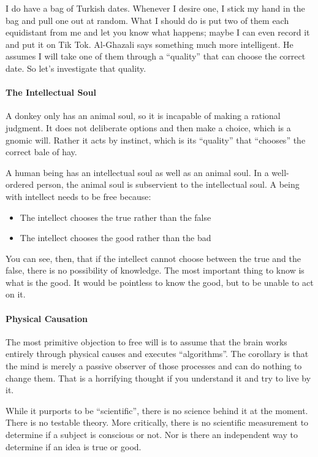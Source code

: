 I do have a bag of Turkish dates. Whenever I desire one, I stick my hand in the bag and pull one out at random. What I should do is put two of them each equidistant from me and let you know what happens; maybe I can even record it and put it on Tik Tok. Al-Ghazali says something much more intelligent. He assumes I will take one of them through a ``quality'' that can choose the correct date. So let's investigate that quality.

\paragraph{The Intellectual Soul}


A donkey only has an animal soul, so it is incapable of making a rational judgment. It does not deliberate options and then make a choice, which is a gnomic will. Rather it acts by instinct, which is its ``quality'' that ``chooses'' the correct bale of hay.

A human being has an intellectual soul as well as an animal soul. In a well-ordered person, the animal soul is subservient to the intellectual soul. A being with intellect needs to be free because:

\begin{itemize}


\item The intellect chooses the true rather than the false

\item The intellect chooses the good rather than the bad
\end{itemize}


You can see, then, that if the intellect cannot choose between the true and the false, there is no possibility of knowledge. The most important thing to know is what is the good. It would be pointless to know the good, but to be unable to act on it.

\paragraph{Physical Causation}


The most primitive objection to free will is to assume that the brain works entirely through physical causes and executes ``algorithms''. The corollary is that the mind is merely a passive observer of those processes and can do nothing to change them. That is a horrifying thought if you understand it and try to live by it.

While it purports to be ``scientific'', there is no science behind it at the moment. There is no testable theory. More critically, there is no scientific measurement to determine if a subject is conscious or not. Nor is there an independent way to determine if an idea is true or good.

